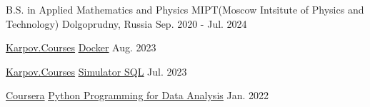 
\begin{cventries}

  \cventry
  {B.S. in Applied Mathematics and Physics}
  {MIPT(Moscow Intsitute of Physics and Technology)}
  {Dolgoprudny, Russia}
  {Sep. 2020 - Jul. 2024}
  {}

  \cventry
  {\href{https://karpov.courses}{Karpov.Courses}}
  {\href{https://lab.karpov.courses/certificate/e0d12f13-e1ff-4bd0-ac1d-46dcda8aeff7/en/}{\underline{Docker}}}
  {}
  {Aug. 2023}
  {}

  \cventry
  {\href{https://karpov.courses}{Karpov.Courses}}
  {\href{https://lab.karpov.courses/certificate/72ae7efc-d706-4623-b739-e2a7a9a4d75b/en/}{\underline{Simulator SQL}}}
  {}
  {Jul. 2023}
  {}

  \cventry
  {\href{https://coursera.org/}{Coursera}}
  {\href{https://coursera.org/share/42912506e140c0586a5a248332a9c86e}{\underline{Python Programming for Data Analysis}}}
  {}
  {Jan. 2022}
  {}

\end{cventries}
